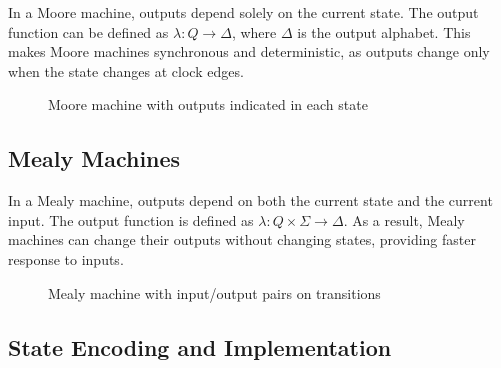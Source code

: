 In a Moore machine, outputs depend solely on the current state. The output function can be defined as $\lambda: Q \rightarrow \Delta$, where $\Delta$ is the output alphabet. This makes Moore machines synchronous and deterministic, as outputs change only when the state changes at clock edges.

\begin{figure}[h]
    \centering
    \caption{Moore machine with outputs indicated in each state}
    \label{fig:moore_machine}
\end{figure}

\subsection*{Mealy Machines}

In a Mealy machine, outputs depend on both the current state and the current input. The output function is defined as $\lambda: Q \times \Sigma \rightarrow \Delta$. As a result, Mealy machines can change their outputs without changing states, providing faster response to inputs.

\begin{figure}[h]
    \centering
    \caption{Mealy machine with input/output pairs on transitions}
    \label{fig:mealy_machine}
\end{figure}

\subsection{State Encoding and Implementation}

